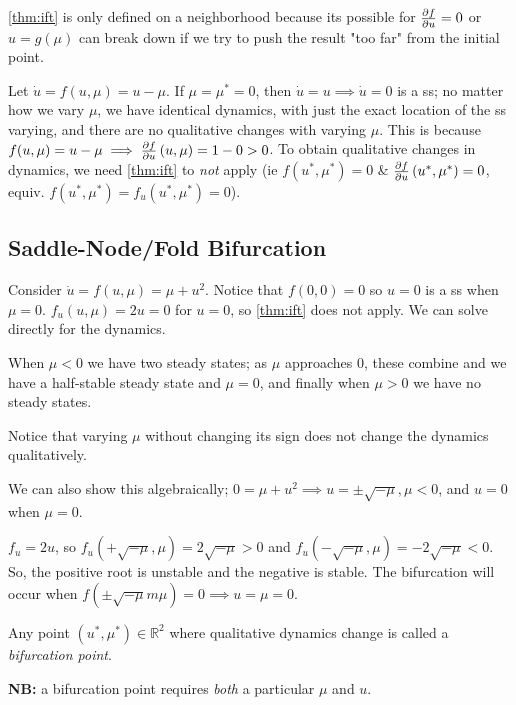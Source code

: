 \documentclass[12pt, oneside]{article}
\begin{document}
\begin{remark}
  \cref{thm:ift} is only defined on a neighborhood because its possible for $\pdv{f}{u} (g(\mu), \mu) = 0$ or $u = g(\mu)$ can break down if we try to push the result "too far" from the initial point.
\end{remark}

\begin{example}
  Let $\dot{u} = f(u, \mu) = u - \mu$. If $\mu = \mu^* = 0$, then $\dot{u} = u \implies \dot{u} = 0$ is a ss; no matter how we vary $\mu$, we have identical dynamics, with just the exact location of the ss varying, and there are no qualitative changes with varying $\mu$. This is because $f(u, \mu) = u - \mu \implies \pdv{f}{u} \left(u, \mu\right) = 1 - 0 > 0$. To obtain qualitative changes in dynamics, we need \cref{thm:ift} to \emph{not} apply (ie $f(u^*, \mu^*) = 0$ \& $\pdv{f}{u} \left(u^*, \mu^*\right) = 0$, equiv. $f(u^*, \mu^*) = f_u (u^*, \mu^*) = 0$).
\end{example}

\subsection{Saddle-Node/Fold Bifurcation}

\begin{example}
  Consider $\dot{u} = f(u, \mu) = \mu + u^2$. Notice that $f(0,0) = 0$ so $u = 0$ is a ss when $\mu = 0$. $f_u(u, \mu) = 2u =0$ for $u = 0$, so \cref{thm:ift} does not apply. We can solve directly for the dynamics.

 When $\mu < 0$ we have two steady states; as $\mu$ approaches 0, these combine and we have a half-stable steady state and $\mu = 0$, and finally when $\mu > 0$ we have no steady states.

 Notice that varying $\mu$ without changing its sign does not change the dynamics qualitatively.

 We can also show this algebraically; $0 = \mu + u^2 \implies u = \pm \sqrt{-\mu}, \mu < 0$, and $u = 0$ when $\mu = 0$.

 $f_u = 2u$, so $f_u(+\sqrt{-\mu}, \mu) = 2 \sqrt{-\mu} > 0$ and $f_u(-\sqrt{-\mu}, \mu) = -2 \sqrt{-\mu} < 0$. So, the positive root is unstable and the negative is stable. The bifurcation will occur when $f(\pm \sqrt{-\mu}m \mu) = 0 \implies u = \mu = 0$.
\end{example}

\begin{definition}
  Any point $(u^*, \mu^*) \in \mathbb{R}^2$ where qualitative dynamics change is called a \emph{bifurcation point}.

  \textbf{NB:} a bifurcation point requires \emph{both} a particular $\mu$ and $u$.
\end{definition}
\end{document}
